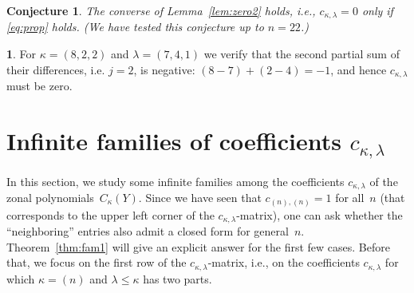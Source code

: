 \documentclass[10pt,oneside,american]{amsart}
\numberwithin{equation}{section}
\numberwithin{figure}{section}
\theoremstyle{plain}
\theoremstyle{definition}
\theoremstyle{remark}
\theoremstyle{plain}
\theoremstyle{definition}
\newtheorem{example}[thm]{\protect\examplename}
\theoremstyle{plain}
\theoremstyle{plain}
\newtheorem{conj}[thm]{Conjecture}
\providecommand{\examplename}{Example}
\begin{document}
\begin{conj}
  The converse of Lemma~\eqref{lem:zero2} holds, i.e., $c_{\kappa,\lambda}=0$
  only if \eqref{eq:prop} holds. (We have tested this conjecture up to
  $n=22$.)
\end{conj}

\begin{example}
  For $\kappa=(8,2,2)$ and $\lambda=(7,4,1)$ we verify that the second
  partial sum of their differences, i.e. $j=2$, is negative:
  $(8-7)+(2-4)=-1$, and hence $c_{\kappa,\lambda}$ must be zero.
\end{example}


\section{Infinite families of coefficients $c_{\kappa,\lambda}$}

In this section, we study some infinite families among the coefficients
$c_{\kappa,\lambda}$ of the zonal polynomials~$C_{\kappa}(Y)$. Since we have
seen that $c_{(n),(n)}=1$ for all~$n$ (that corresponds to the upper left
corner of the $c_{\kappa,\lambda}$-matrix), one can ask whether the
``neighboring'' entries also admit a closed form for general~$n$.
Theorem~\ref{thm:fam1} will give an explicit answer for the first few cases.
Before that, we focus on the first row of the $c_{\kappa,\lambda}$-matrix,
i.e., on the coefficients $c_{\kappa,\lambda}$ for which
$\kappa=\left(n\right)$ and $\lambda\leq\kappa$ has two parts.
\end{document}
